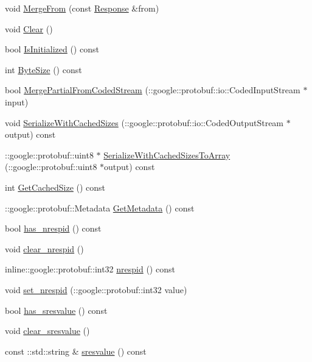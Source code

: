 \begin{DoxyCompactItemize}
\item 
void \hyperlink{classResponse_abc26844f6c23c5333bce060bdf58c4d9}{Merge\-From} (const \hyperlink{classResponse}{Response} \&from)
\item 
void \hyperlink{classResponse_aded1da77e771f9c129cb044bc527417c}{Clear} ()
\item 
bool \hyperlink{classResponse_ab6875ed109432f6af22f57587226d6ab}{Is\-Initialized} () const 
\item 
int \hyperlink{classResponse_aff729a523c355600e18f12b24ff4da54}{Byte\-Size} () const 
\item 
bool \hyperlink{classResponse_a98f35d4fe7c67d44a782ffae7ca10110}{Merge\-Partial\-From\-Coded\-Stream} (\-::google\-::protobuf\-::io\-::\-Coded\-Input\-Stream $\ast$input)
\item 
void \hyperlink{classResponse_a8ed60ad1bffd14a07f8dfc2212c19315}{Serialize\-With\-Cached\-Sizes} (\-::google\-::protobuf\-::io\-::\-Coded\-Output\-Stream $\ast$output) const 
\item 
\-::google\-::protobuf\-::uint8 $\ast$ \hyperlink{classResponse_aa9d8421f7d2cd36553d68e332d022adf}{Serialize\-With\-Cached\-Sizes\-To\-Array} (\-::google\-::protobuf\-::uint8 $\ast$output) const 
\item 
int \hyperlink{classResponse_a3077bd0d5e1553a75928ee6980804cb1}{Get\-Cached\-Size} () const 
\item 
\-::google\-::protobuf\-::\-Metadata \hyperlink{classResponse_a44216502159a7a2b18b0a7ffd8e99aba}{Get\-Metadata} () const 
\item 
bool \hyperlink{classResponse_a87462b297f3de4962033477197707718}{has\-\_\-nrespid} () const 
\item 
void \hyperlink{classResponse_aba79982604ea240917718d0cf27c784f}{clear\-\_\-nrespid} ()
\item 
inline\-::google\-::protobuf\-::int32 \hyperlink{classResponse_ab7b613c78f51cec62c232c333f4519c8}{nrespid} () const 
\item 
void \hyperlink{classResponse_a3d49eae45f66dddb23bab432a04f2da3}{set\-\_\-nrespid} (\-::google\-::protobuf\-::int32 value)
\item 
bool \hyperlink{classResponse_a0720e9599ced793f68d2f637d4c99158}{has\-\_\-sresvalue} () const 
\item 
void \hyperlink{classResponse_a51ad3d3cf86791ed682902ccbc0442fe}{clear\-\_\-sresvalue} ()
\item 
const \-::std\-::string \& \hyperlink{classResponse_a4fff1cf3287c2be6f36c8a616758f068}{sresvalue} () const 

\end{DoxyCompactItemize}
